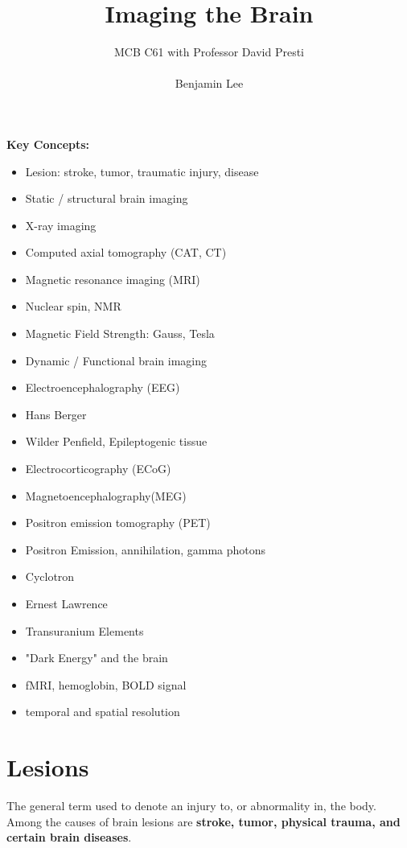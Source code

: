 \documentclass{article}
\title{Imaging the Brain}
\author{MCB C61 with Professor David Presti \\ \\ Benjamin Lee}
\begin{document}
\maketitle

\textbf{Key Concepts:}
\begin{itemize}
    \item Lesion: stroke, tumor, traumatic injury, disease
    \item Static / structural brain imaging
    \item X-ray imaging
    \item Computed axial tomography (CAT, CT)
    \item Magnetic resonance imaging (MRI)
    \item Nuclear spin, NMR
    \item Magnetic Field Strength: Gauss, Tesla
    \item Dynamic / Functional brain imaging
    \item Electroencephalography (EEG)
    \item Hans Berger
    \item Wilder Penfield, Epileptogenic tissue
    \item Electrocorticography (ECoG) 
    \item Magnetoencephalography(MEG) 
    \item Positron emission tomography (PET) 
    \item Positron Emission, annihilation, gamma photons
    \item Cyclotron
    \item Ernest Lawrence
    \item Transuranium Elements
    \item "Dark Energy" and the brain
    \item fMRI, hemoglobin, BOLD signal
    \item temporal and spatial resolution
\end{itemize}

\newpage

\section{Lesions}

The general term used to denote an injury to, or abnormality in, the body. \\

Among the causes of brain lesions are \textbf{stroke, tumor, physical trauma, and certain brain diseases}. \\
\end{document}
